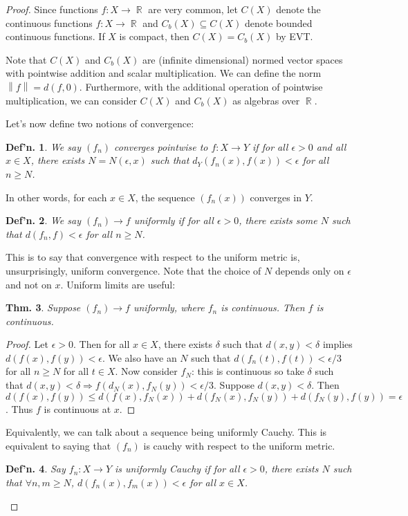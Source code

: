 \documentclass[12pt, a4paper]{book}
\DeclareMathOperator{\R}{\mathbb{R}}
\newcommand{\norm}[1]{\left\lVert#1\right\rVert} %
\newtheorem{theorem}{Thm.}[section]
\newtheorem{definition}[theorem]{Def'n.}
\theoremstyle{nonumberplain}
\newtheorem{proof}{Proof}
\begin{document}
\begin{proof}
Since functions $f:X\to\R$ are very common, let $C(X)$ denote the continuous functions $f:X\to\R$ and $C_b(X)\subseteq C(X)$ denote bounded continuous functions.
If $X$ is compact, then $C(X)=C_b(X)$ by EVT.

Note that $C(X)$ and $C_b(X)$ are (infinite dimensional) normed vector spaces with pointwise addition and scalar multiplication.
We can define the norm $\norm{f}=d(f,0)$.
Furthermore, with the additional operation of pointwise multiplication, we can consider $C(X)$ and $C_b(X)$ as algebras over $\R$.

Let's now define two notions of convergence:
\begin{definition}
    We say $(f_n)$ converges pointwise to $f:X\to Y$ if for all $\epsilon>0$ and all $x\in X$, there exists $N=N(\epsilon,x)$
    such that $d_Y(f_n(x),f(x))<\epsilon$ for all $n\geq N$.
\end{definition}
In other words, for each $x\in X$, the sequence $(f_n(x))$ converges in $Y$.
\begin{definition}
    We say $(f_n)\to f$ uniformly if for all $\epsilon>0$, there exists some $N$ such that $d(f_n,f)<\epsilon$ for all $n\geq N$.
\end{definition}
This is to say that convergence with respect to the uniform metric is, unsurprisingly, uniform convergence.
Note that the choice of $N$ depends only on $\epsilon$ and not on $x$.
Uniform limits are useful:
\begin{theorem}
    Suppose $(f_n)\to f$ uniformly, where $f_n$ is continuous.
    Then $f$ is continuous.
\end{theorem}
\begin{proof}
    Let $\epsilon>0$. Then for all $x\in X$, there exists $\delta$ such that $d(x,y)<\delta$ implies $d(f(x),f(y))<\epsilon$.
    We also have an $N$ such that $d(f_n(t),f(t))<\epsilon/3$ for all $n\geq N$ for all $t\in X$. Now consider $f_N$:
    this is continuous so take $\delta$ such that $d(x,y)<\delta\Rightarrow f(d_N(x),f_N(y))<\epsilon/3$. Suppose
    $d(x,y)<\delta$. Then $d(f(x),f(y))\leq d(f(x),f_N(x))+d(f_N(x),f_N(y))+d(f_N(y),f(y))=\epsilon$. Thus $f$ is continuous
    at $x$.
\end{proof}
Equivalently, we can talk about a sequence being uniformly Cauchy.
This is equivalent to saying that $(f_n)$ is cauchy with respect to the uniform metric.
\begin{definition}
    Say $f_n:X\to Y$ is uniformly Cauchy if for all $\epsilon>0$, there exists $N$ such that $\forall n,m\geq N$,
    $d(f_n(x),f_m(x))<\epsilon$ for all $x\in X$.

\end{definition}
\end{proof}
\end{document}
